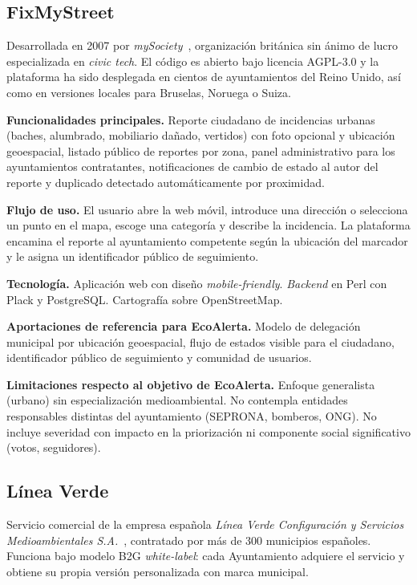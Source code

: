 \subsection{FixMyStreet}
\label{subsec:fixmystreet}

Desarrollada en 2007 por \textit{mySociety}~\parencite{fixmystreet}, organización británica sin ánimo de lucro especializada en \textit{civic tech}. El código es abierto bajo licencia AGPL-3.0 y la plataforma ha sido desplegada en cientos de ayuntamientos del Reino Unido, así como en versiones locales para Bruselas, Noruega o Suiza.

\textbf{Funcionalidades principales.}  Reporte ciudadano de incidencias urbanas (baches, alumbrado, mobiliario dañado, vertidos) con foto opcional y ubicación geoespacial, listado público de reportes por zona, panel administrativo para los ayuntamientos contratantes, notificaciones de cambio de estado al autor del reporte y duplicado detectado automáticamente por proximidad.

\textbf{Flujo de uso.}  El usuario abre la web móvil, introduce una dirección o selecciona un punto en el mapa, escoge una categoría y describe la incidencia. La plataforma encamina el reporte al ayuntamiento competente según la ubicación del marcador y le asigna un identificador público de seguimiento.

\textbf{Tecnología.}  Aplicación web con diseño \textit{mobile-friendly}. \textit{Backend} en Perl con Plack y PostgreSQL. Cartografía sobre OpenStreetMap.

\textbf{Aportaciones de referencia para EcoAlerta.}  Modelo de delegación municipal por ubicación geoespacial, flujo de estados visible para el ciudadano, identificador público de seguimiento y comunidad de usuarios.

\textbf{Limitaciones respecto al objetivo de EcoAlerta.}  Enfoque generalista (urbano) sin especialización medioambiental. No contempla entidades responsables distintas del ayuntamiento (SEPRONA, bomberos, ONG). No incluye severidad con impacto en la priorización ni componente social significativo (votos, seguidores).


\subsection{Línea Verde}
\label{subsec:linea-verde}

Servicio comercial de la empresa española \textit{Línea Verde Configuración y Servicios Medioambientales S.A.}~\parencite{lineaverde}, contratado por más de 300 municipios españoles. Funciona bajo modelo B2G \textit{white-label}: cada Ayuntamiento adquiere el servicio y obtiene su propia versión personalizada con marca municipal.

